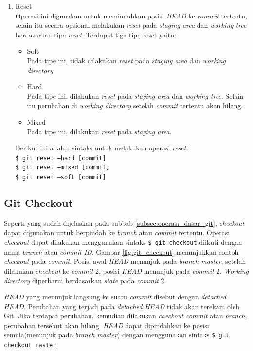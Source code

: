 \begin{enumerate}
\item Reset\\
Operasi ini digunakan untuk memindahkan posisi \textit{HEAD} ke \textit{commit} tertentu, selain itu secara opsional  melakukan \textit{reset} pada \textit{staging area} dan \textit{working tree} berdasarkan tipe \textit{reset}. Terdapat tiga tipe reset yaitu:
\begin{itemize}
\item Soft\\
Pada tipe ini, tidak dilakukan \textit{reset} pada \textit{staging area} dan \textit{working directory}.
\item Hard\\
Pada tipe ini, dilakukan \textit{reset} pada \textit{staging area} dan \textit{working tree}. Selain itu perubahan di \textit{working directory} setelah \textit{commit} tertentu akan hilang.
\item Mixed\\
Pada tipe ini, dilakukan \textit{reset} pada \textit{staging area}.
\end{itemize} 

Berikut ini adalah sintaks untuk melakukan operasi \textit{reset}:\\
\texttt{\$ git reset --hard [commit]}\\
\texttt{\$ git reset --mixed [commit]}\\
\texttt{\$ git reset --soft [commit]}
\end{enumerate}
\subsection{Git Checkout}
\label{subsec:git_checkout}
Seperti yang sudah dijelaskan pada subbab \ref{subsec:operasi_dasar_git}, \textit{checkout} dapat digunakan untuk berpindah ke \textit{branch} atau \textit{commit} tertentu. Operasi \textit{checkout} dapat dilakukan menggunakan sintaks \texttt{\$ git checkout} diikuti dengan nama \textit{branch} atau \textit{commit ID}. Gambar \ref{fig:git_checkout} menunjukkan contoh \textit{checkout} pada \textit{commit}. Posisi awal \textit{HEAD} menunjuk pada \textit{branch master}, setelah dilakukan \textit{checkout} ke \textit{commit} 2, posisi \textit{HEAD} menunjuk pada \textit{commit} 2. \textit{Working directory} diperbarui berdasarkan \textit{state} pada \textit{commit} 2. 

\textit{HEAD} yang menunjuk langsung ke suatu \textit{commit} disebut dengan \textit{detached HEAD}. Perubahan yang terjadi pada \textit{detached HEAD} tidak akan terekam oleh Git. Jika terdapat perubahan, kemudian dilakukan \textit{checkout commit} atau \textit{branch}, perubahan tersebut akan hilang. \textit{HEAD} dapat dipindahkan ke posisi semula(menunjuk pada \textit{branch master}) dengan  menggunakan sintaks \texttt{\$ git checkout master}.


